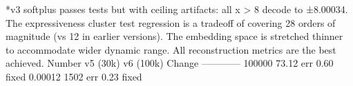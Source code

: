 {}\markdownRendererPipe{}  \markdownRendererPipe{}  \markdownRendererPipe{}  \markdownRendererPipe{}  \markdownRendererPipe{}  \markdownRendererPipe{}  \markdownRendererPipe{}  \markdownRendererPipe{}\markdownRendererParagraphSeparator
{}*v3 softplus passes tests but with ceiling artifacts: all \markdownRendererPipe{}x\markdownRendererPipe{} > 8 decode to ±8.00034.\markdownRendererParagraphSeparator
{} The expressiveness cluster test regression is a tradeoff of covering 28 orders of magnitude (vs 12 in earlier versions). The embedding space is stretched thinner to accommodate wider dynamic range. All reconstruction metrics are the best achieved.\markdownRendererInterblockSeparator
{}\markdownRendererThematicBreak{}\markdownRendererInterblockSeparator
{}
\markdownRendererSectionEnd \markdownRendererSectionBegin
{}\markdownRendererInterblockSeparator
{}\markdownRendererInterblockSeparator
{}\markdownRendererThematicBreak{}\markdownRendererInterblockSeparator
{}\markdownRendererInterblockSeparator
{}\markdownRendererThematicBreak{}\markdownRendererInterblockSeparator
{}\markdownRendererSectionBegin
{}\markdownRendererInterblockSeparator
{}\markdownRendererPipe{} Number \markdownRendererPipe{} v5 (30k) \markdownRendererPipe{} v6 (100k) \markdownRendererPipe{} Change \markdownRendererPipe{}\markdownRendererSoftLineBreak
{}\markdownRendererPipe{}---\markdownRendererPipe{}---\markdownRendererPipe{}---\markdownRendererPipe{}---\markdownRendererPipe{}\markdownRendererSoftLineBreak
{}\markdownRendererPipe{} 100000 \markdownRendererPipe{} 73.12\markdownRendererPercentSign{} err \markdownRendererPipe{} 0.60\markdownRendererPercentSign{} \markdownRendererPipe{} fixed \markdownRendererPipe{}\markdownRendererSoftLineBreak
{}\markdownRendererPipe{} 0.00012 \markdownRendererPipe{} 1502\markdownRendererPercentSign{} err \markdownRendererPipe{} 0.23\markdownRendererPercentSign{} \markdownRendererPipe{} fixed \markdownRendererPipe{}\markdownRendererSoftLineBreak
